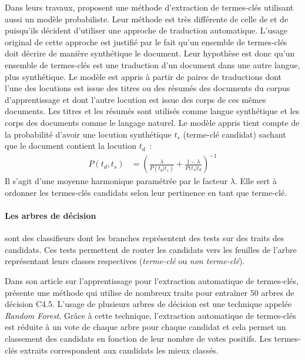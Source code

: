           Dans leurs travaux, \citet{liu2011vocabularygap} proposent une méthode
          d'extraction de termes-clés utilisant aussi un modèle probabiliste.
          Leur méthode est très différente de celle de \citet{witten1999kea} et
          de \citet{sujian2003maximumentropy} puisqu'ils décident d'utiliser une
          approche de traduction automatique. L'usage original de cette approche
          est justifié par le fait qu'un ensemble de termes-clés doit décrire de
          manière synthétique le document. Leur hypothèse est donc qu'un
          ensemble de termes-clés est une traduction d'un document dans une
          autre langue, plus synthétique. Le modèle est appris à partir de
          paires de traductions dont l'une des locutions est issue des titres ou
          des résumés des documents du corpus d'apprentissage et dont l'autre
          locution est issue des corps de ces mêmes documents. Les titres et les
          résumés sont utilisés comme langue synthétique et les corps des
          documents comme le langage naturel. Le modèle appris tient compte de
          la probabilité d'avoir une locution synthétique $t_s$ (terme-clé
          candidat) sachant que le document contient la locution $t_d$~:
            \begin{align}
              P(t_d, t_s) &= \left(\frac{\lambda}{P(t_d | t_s)} + \frac{1 - \lambda}{P(t_s | t_d}\right)^{-1}
            \end{align}
          Il s'agit d'une moyenne harmonique paramétrée par le facteur
          $\lambda$. Elle sert à ordonner les termes-clés candidats selon leur
          pertinence en tant que terme-clé.

        \paragraph{Les arbres de décision}
          sont des classifieurs dont les branches représentent des tests sur des
          traits des candidats. Ces tests permettent de router les candidats
          vers les feuilles de l'arbre représentant leurs classes respectives
          (\textit{terme-clé} ou \textit{non terme-clé}).

          Dans son article sur l'apprentissage pour l'extraction automatique de
          termes-clés, \citet{turney1999learningalgorithms} présente une méthode
          qui utilise de nombreux traits pour entraîner $50$ arbres de décision
          C4.5. L'usage de plusieurs arbres de décision est une technique
          appelée \textit{Random Forest}. Grâce à cette technique, l'extraction
          automatique de termes-clés est réduite à un vote de chaque arbre pour
          chaque candidat et cela permet un classement des candidats en fonction
          de leur nombre de votes positifs. Les termes-clés extraits
          correspondent aux candidats les mieux classés.


